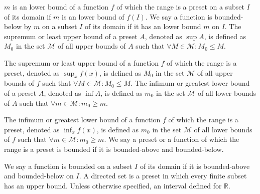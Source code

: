 \documentclass[a4paper,12pt]{article}
\begin{document}
$m$ is an lower bound of a function $f$ of which the range is a preset on a subset $I$ of its domain if $m$ is an lower bound of $f(I)$. We say a function is bounded-below by $m$ on a subset $I$ of its domain if it has an lower bound $m$ on $I$.
The supremum or least upper bound of a preset $A$, denoted as $\sup A$, is defined as $M_0$ in the set $\mathcal{M}$ of all upper bounds of $A$ such that $\forall M\in\mathcal{M}\colon M_0\leq M$.

The supremum or least upper bound of a function $f$ of which the range is a preset, denoted as $\sup_xf(x)$, is defined as $M_0$ in the set $\mathcal{M}$ of all upper bounds of $f$ such that $\forall M\in\mathcal{M}\colon M_0\leq M$.
The infimum or greatest lower bound of a preset $A$, denoted as $\inf A$, is defined as $m_0$ in the set $\mathcal{M}$ of all lower bounds of $A$ such that $\forall m\in\mathcal{M}\colon m_0\geq m$.

The infimum or greatest lower bound of a function $f$ of which the range is a preset, denoted as $\inf_xf(x)$, is defined as $m_0$ in the set $\mathcal{M}$ of all lower bounds of $f$ such that $\forall m\in\mathcal{M}\colon m_0\geq m$.
We say a preset or a function of which the range is a preset is bounded if it is bounded-above and bounded-below.

We say a function is bounded on a subset $I$ of its domain if it is bounded-above and bounded-below on $I$.
A directed set is a preset in which every finite subset has an upper bound.
Unless otherwise specified, an interval defined for $\mathbb{R}$.
\end{document}

